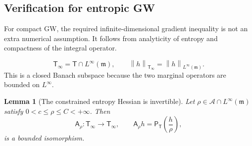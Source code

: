 \documentclass[11pt]{article}
\newtheorem{lemma}[theorem]{Lemma}
\theoremstyle{definition}
\theoremstyle{remark}
\newcommand{\norm}[1]{\left\lVert #1\right\rVert}
\begin{document}
\subsection{Verification for entropic GW}

For compact GW, the required infinite-dimensional gradient inequality is not
an extra numerical assumption.  It follows from analyticity of entropy and
compactness of the integral operator.

\[
 \mathsf T_\infty
 =
 \mathsf T\cap L^\infty(\mathfrak m),
 \qquad
 \norm{h}_{\mathsf T_\infty}=\norm{h}_{L^\infty(\mathfrak m)}.
\]
This is a closed Banach subspace because the two marginal operators are
bounded on \(L^\infty\).

\begin{lemma}[The constrained entropy Hessian is invertible]
\label{lem:entropy-hessian-isomorphism}
Let \(\rho\in\mathcal A\cap L^\infty(\mathfrak m)\) satisfy
\(0<c\leq\rho\leq C<+\infty\).  Then
\begin{equation}\label{eq:constrained-entropy-hessian}
 \mathsf A_\rho:\mathsf T_\infty\longrightarrow\mathsf T_\infty,
 \qquad
 \mathsf A_\rho h
 =
 \mathsf P_{\mathsf T}\left(\frac h\rho\right),
\end{equation}
is a bounded isomorphism.
\end{lemma}
\end{document}
